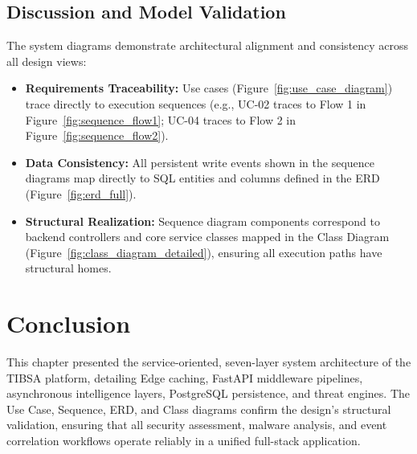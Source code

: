 \subsection{Discussion and Model Validation}
\label{subsec:discussion_and_model_validation}

The system diagrams demonstrate architectural alignment and consistency across all design views:
\begin{itemize}
    \item \textbf{Requirements Traceability:} Use cases (Figure~\ref{fig:use_case_diagram}) trace directly to execution sequences (e.g., UC-02 traces to Flow 1 in Figure~\ref{fig:sequence_flow1}; UC-04 traces to Flow 2 in Figure~\ref{fig:sequence_flow2}).
    \item \textbf{Data Consistency:} All persistent write events shown in the sequence diagrams map directly to SQL entities and columns defined in the ERD (Figure~\ref{fig:erd_full}).
    \item \textbf{Structural Realization:} Sequence diagram components correspond to backend controllers and core service classes mapped in the Class Diagram (Figure~\ref{fig:class_diagram_detailed}), ensuring all execution paths have structural homes.
\end{itemize}

\section{Conclusion}

This chapter presented the service-oriented, seven-layer system architecture of the TIBSA platform, detailing Edge caching, FastAPI middleware pipelines, asynchronous intelligence layers, PostgreSQL persistence, and threat engines. The Use Case, Sequence, ERD, and Class diagrams confirm the design's structural validation, ensuring that all security assessment, malware analysis, and event correlation workflows operate reliably in a unified full-stack application.
